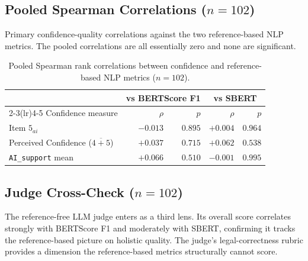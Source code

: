 \subsection{Pooled Spearman Correlations ($n = 102$)}

Primary confidence-quality correlations against the two
reference-based NLP metrics. The pooled correlations are all
essentially zero and none are significant.

\begin{table}[H]
\centering
\caption{Pooled Spearman rank correlations between confidence and
reference-based NLP metrics ($n = 102$).}
\label{tab:app-corr-pooled}
\small
\begin{tabular}{@{}l r r r r@{}}
\toprule
& \multicolumn{2}{c}{vs BERTScore F1} & \multicolumn{2}{c}{vs SBERT} \\
\cmidrule(lr){2-3}\cmidrule(lr){4-5}
Confidence measure  & $\rho$ & $p$ & $\rho$ & $p$ \\
\midrule
Item $5_{ai}$                              & $-0.013$ & $0.895$ & $+0.004$ & $0.964$ \\
Perceived Confidence ($\overline{4{+}5}$)  & $+0.037$ & $0.715$ & $+0.062$ & $0.538$ \\
\texttt{AI\_support} mean                  & $+0.066$ & $0.510$ & $-0.001$ & $0.995$ \\
\bottomrule
\end{tabular}
\end{table}

\subsection{Judge Cross-Check ($n = 102$)}

The reference-free LLM judge enters as a third lens. Its overall
score correlates strongly with BERTScore F1 and moderately with
SBERT, confirming it tracks the reference-based picture on
holistic quality. The judge's legal-correctness rubric provides
a dimension the reference-based metrics structurally cannot
score.

